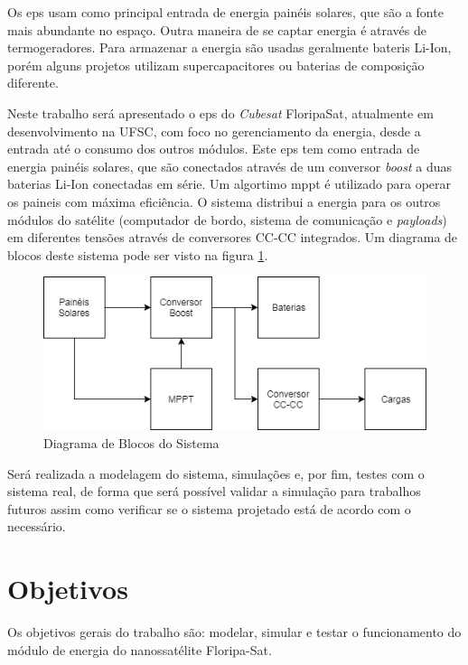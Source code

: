 Os \gls{eps} usam como principal entrada de energia painéis solares, que são a fonte mais abundante no espaço. Outra maneira de se captar energia é através de termogeradores. Para armazenar a energia são usadas geralmente bateris Li-Ion, porém alguns projetos utilizam supercapacitores ou baterias de composição diferente.

Neste trabalho será apresentado o \gls{eps} do \textit{Cubesat} FloripaSat, atualmente em desenvolvimento na UFSC, com foco no gerenciamento da energia, desde a entrada até o consumo dos outros módulos. Este \gls{eps} tem como entrada de energia painéis solares, que são conectados através de um conversor \textit{boost} a duas baterias Li-Ion conectadas em série. Um algortimo \gls{mppt} é utilizado para operar os paineis com máxima eficiência. O sistema distribui a energia para os outros módulos do satélite (computador de bordo, sistema de comunicação e \textit{payloads}) em diferentes tensões através de conversores CC-CC integrados. Um diagrama de blocos deste sistema pode ser visto na figura \ref{figura_diagrama_blocos}.

\begin{figure}[!htpb]
\begin{center}
\includegraphics[scale=0.5]{figures/diagramaBlocos.png}
\end{center}
\caption{Diagrama de Blocos do Sistema}
\label{figura_diagrama_blocos}
\end{figure}


Será realizada a modelagem do sistema, simulações e, por fim, testes com o sistema real, de forma que será possível validar a simulação para trabalhos futuros assim como verificar se o sistema projetado está de acordo com o necessário.

\section{Objetivos}

Os objetivos gerais do trabalho são: modelar, simular e testar o funcionamento do módulo de energia do nanossatélite Floripa-Sat.

